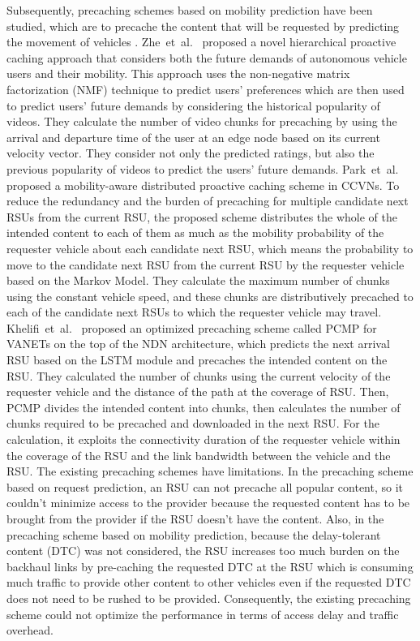 \documentclass{ieeeaccess}
\begin{document}
Subsequently, precaching schemes based on mobility prediction have been studied, which are to precache the content that will be requested by predicting the movement of vehicles \cite{Zhe2020, Park2019, Khelifi2018}.
Zhe~et~al.~\cite{Zhe2020} proposed a novel hierarchical proactive caching approach that considers both the future demands of autonomous vehicle users and their mobility. This approach uses the non-negative matrix factorization (NMF) technique to predict users’ preferences which are then used to predict users’ future demands by considering the historical popularity of videos. They calculate the number of video chunks for precaching by using the arrival and departure time of the user at an edge node based on its current velocity vector. They consider not only the predicted ratings, but also the previous popularity of videos to predict the users’ future demands.
Park~et~al.~\cite{Park2019} proposed a mobility-aware distributed proactive caching scheme in CCVNs. To reduce the redundancy and the burden of precaching for multiple candidate next RSUs from the current RSU, the proposed scheme distributes the whole of the intended content to each of them as much as the mobility probability of the requester vehicle about each candidate next RSU, which means the probability to move to the candidate next RSU from the current RSU by the requester vehicle based on the Markov Model. They calculate the maximum number of chunks using the constant vehicle speed, and these chunks are distributively precached to each of the candidate next RSUs to which the requester vehicle may travel.
Khelifi~et~al.~\cite{Khelifi2018} proposed an optimized precaching scheme called PCMP for VANETs on the top of the NDN architecture, which predicts the next arrival RSU based on the LSTM module and precaches the intended content on the RSU. They calculated the number of chunks using the current velocity of the requester vehicle and the distance of the path at the coverage of RSU. Then, PCMP divides the intended content into chunks, then calculates the number of chunks required to be precached and downloaded in the next RSU. For the calculation, it exploits the connectivity duration of the requester vehicle within the coverage of the RSU and the link bandwidth between the vehicle and the RSU.
The existing precaching schemes have limitations.
In the precaching scheme based on request prediction, an RSU can not precache all popular content, so it couldn't minimize access to the provider because the requested content has to be brought from the provider if the RSU doesn't have the content.
Also, in the precaching scheme based on mobility prediction, because the delay-tolerant content (DTC) was not considered, the RSU increases too much burden on the backhaul links by pre-caching the requested DTC at the RSU which is consuming much traffic to provide other content to other vehicles even if the requested DTC does not need to be rushed to be provided.
Consequently, the existing precaching scheme could not optimize the performance in terms of access delay and traffic overhead.
\end{document}
